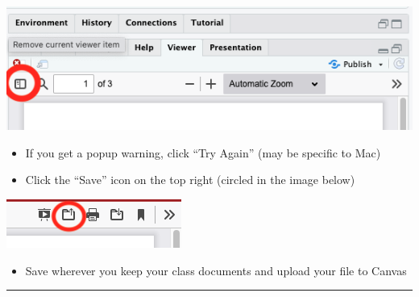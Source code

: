 \documentclass[
  letterpaper,
  DIV=11,
  numbers=noendperiod]{scrartcl}
\providecommand{\tightlist}{%
  \setlength{\itemsep}{0pt}\setlength{\parskip}{0pt}}\usepackage{longtable,booktabs,array}
\begin{document}
\includegraphics{images/sidebar.png}

\begin{itemize}
\tightlist
\item
  If you get a popup warning, click ``Try Again'' (may be specific to
  Mac)
\item
  Click the ``Save'' icon on the top right (circled in the image below)
\end{itemize}

\includegraphics{images/save_pdf.png}

\begin{itemize}
\tightlist
\item
  Save wherever you keep your class documents and upload your file to
  Canvas
\end{itemize}

\begin{center}\rule{0.5\linewidth}{0.5pt}\end{center}
\end{document}
